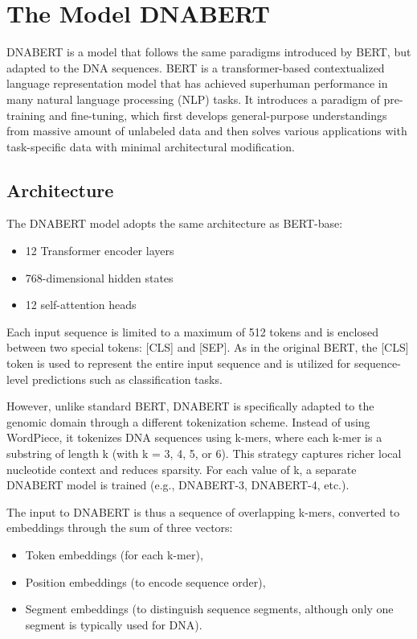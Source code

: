 \section{The Model DNABERT}

DNABERT is a model that follows the same paradigms introduced by BERT, but adapted to the DNA sequences.
BERT is a transformer-based contextualized language representation model that has achieved superhuman performance in many natural language processing (NLP) tasks. It introduces a paradigm of pre-training and fine-tuning, which first develops general-purpose understandings from massive amount of unlabeled data and then solves various applications with task-specific data with minimal architectural modification.


\subsection{Architecture}

The DNABERT model adopts the same architecture as BERT-base:
\begin{itemize}
    \item 12 Transformer encoder layers
    \item 768-dimensional hidden states
    \item 12 self-attention heads
\end{itemize} 

Each input sequence is limited to a maximum of 512 tokens and is enclosed between two special tokens: [CLS] and [SEP]. As in the original BERT, the [CLS] token is used to represent the entire input sequence and is utilized for sequence-level predictions such as classification tasks.

However, unlike standard BERT, DNABERT is specifically adapted to the genomic domain through a different tokenization scheme. Instead of using WordPiece, it tokenizes DNA sequences using k-mers, where each k-mer is a substring of length k (with k = 3, 4, 5, or 6). This strategy captures richer local nucleotide context and reduces sparsity. For each value of k, a separate DNABERT model is trained (e.g., DNABERT-3, DNABERT-4, etc.).

The input to DNABERT is thus a sequence of overlapping k-mers, converted to embeddings through the sum of three vectors:
\begin{itemize}
    \item Token embeddings (for each k-mer),
    \item Position embeddings (to encode sequence order),
    \item Segment embeddings (to distinguish sequence segments, although only one segment is typically used for DNA).
\end{itemize}


